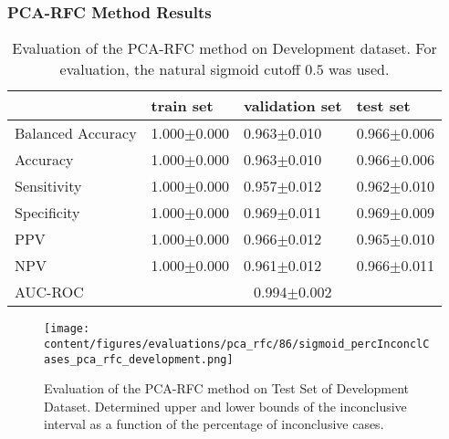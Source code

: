 
\subsubsection{PCA-RFC Method Results}
\label{subsubsec:eval_rfc}




\begin{table}[ht]
  \caption{Evaluation of the PCA-RFC method on Development dataset. 
  For evaluation, the natural sigmoid cutoff $0.5$ was used.}
  \centering
  \begin{tabular}{llll}
      \hline
                        & train set         & validation set      & test set             \\
      \hline
      Balanced Accuracy & 1.000$\pm$0.000   &   0.963$\pm$0.010    &  0.966$\pm$0.006   \\
      Accuracy          & 1.000$\pm$0.000    &   0.963$\pm$0.010  &  0.966$\pm$0.006    \\
      Sensitivity       &  1.000$\pm$0.000   &   0.957$\pm$0.012   &  0.962$\pm$0.010   \\
      Specificity       & 1.000$\pm$0.000    &   0.969$\pm$0.011  &  0.969$\pm$0.009   \\
      PPV               &  1.000$\pm$0.000   &   0.966$\pm$0.012   &  0.965$\pm$0.010   \\
      NPV               &  1.000$\pm$0.000   &   0.961$\pm$0.012  &  0.966$\pm$0.011   \\
      \hline
      AUC-ROC          &  \multicolumn{3}{c}{0.994$\pm$0.002}  \\
      \hline
  \end{tabular}
 \label{t1:erc_perf_eval_table}
\end{table}

\begin{figure}[t]
  \centering
  \texttt{[image: content/figures/evaluations/pca\_rfc/86/sigmoid\_percInconclCases\_pca\_rfc\_development.png]}
  \caption{Evaluation of the PCA-RFC method on Test Set of Development Dataset. 
  Determined upper and lower bounds of the inconclusive interval as a function of the percentage of inconclusive cases.} 
  \label{fig:pca_rfc_percInconclCases_development}
\end{figure}


